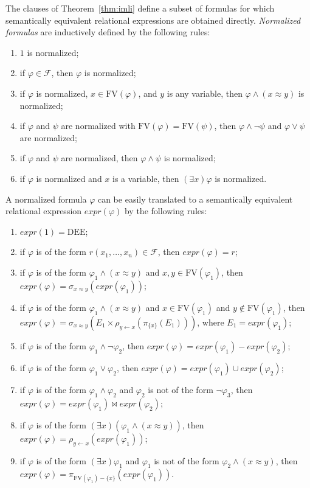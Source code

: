 \documentclass{lmcs}
\def\F{\mathcal F}
\def\expr{expr}
\def\FV{\textrm{FV}}
\def\DEE{\textrm{DEE}}
\begin{document}
The clauses of Theorem~\ref{thm:imli} define a subset of formulas for which semantically equivalent relational expressions are obtained directly. \emph{Normalized formulas} are inductively defined by the following rules:
\begin{enumerate}
\item $1$ is normalized;
\item if $\varphi\in\F$, then $\varphi$ is normalized;
\item if $\varphi$ is normalized, $x\in\FV(\varphi)$, and $y$ is any variable, then $\varphi\wedge(x\approx y)$ is normalized;
\item if $\varphi$ and $\psi$ are normalized with $\FV(\varphi)=\FV(\psi)$, then $\varphi\wedge\neg\psi$ and $\varphi\vee\psi$ are normalized;
\item if $\varphi$ and $\psi$ are normalized, then $\varphi\wedge\psi$ is normalized;
\item if $\varphi$ is normalized and $x$ is a variable, then $(\exists x)\varphi$ is normalized.
\end{enumerate}
A normalized formula $\varphi$ can be easily translated to a semantically equivalent relational expression $\expr(\varphi)$ by the following rules:
\begin{enumerate}
\item $\expr(1)=\DEE$;
\item if $\varphi$ is of the form $r(x_1,\ldots,x_n)\in\F$, then $\expr(\varphi)=r$;
\item if $\varphi$ is of the form $\varphi_1\wedge(x\approx y)$ and $x,y\in\FV(\varphi_1)$, then $\expr(\varphi)=\sigma_{x\approx y}(\expr(\varphi_1))$;
\item if $\varphi$ is of the form $\varphi_1\wedge(x\approx y)$ and $x\in\FV(\varphi_1)$ and $y\notin\FV(\varphi_1)$, then $\expr(\varphi)=\sigma_{x\approx y}(E_1\times\rho_{y\leftarrow x}(\pi_{\{x\}}(E_1)))$, where $E_1=\expr(\varphi_1)$;
\item if $\varphi$ is of the form $\varphi_1\wedge\neg\varphi_2$, then $\expr(\varphi)=\expr(\varphi_1)-\expr(\varphi_2)$;
\item if $\varphi$ is of the form $\varphi_1\vee\varphi_2$, then $\expr(\varphi)=\expr(\varphi_1)\cup\expr(\varphi_2)$;
\item if $\varphi$ is of the form $\varphi_1\wedge\varphi_2$ and $\varphi_2$ is not of the form $\neg\varphi_3$, then $\expr(\varphi)=\expr(\varphi_1)\bowtie\expr(\varphi_2)$;
\item if $\varphi$ is of the form $(\exists x)(\varphi_1\wedge(x\approx y))$, then $\expr(\varphi)=\rho_{y\leftarrow x}(\expr(\varphi_1))$;
\item if $\varphi$ is of the form $(\exists x)\varphi_1$ and $\varphi_1$ is not of the form  $\varphi_2\wedge(x\approx y)$, then  $\expr(\varphi)=\pi_{\FV(\varphi_1)-\{x\}}(\expr(\varphi_1))$.
\end{enumerate}
\end{document}
